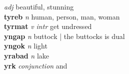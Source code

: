   \emph{adj} \textperiodcentered beautiful, stunning\\\textbf{tyreb}   \emph{n} \textperiodcentered human, person, man, woman\\\textbf{tyrmat}   \emph{v intr} \textperiodcentered get undressed\\\textbf{yngap}   \emph{n} \textperiodcentered buttock | the buttocks is dual\\\textbf{yngok}   \emph{n} \textperiodcentered light\\\textbf{yrabad}   \emph{n} \textperiodcentered lake\\\textbf{yrk}   \emph{conjunction} \textperiodcentered and\\